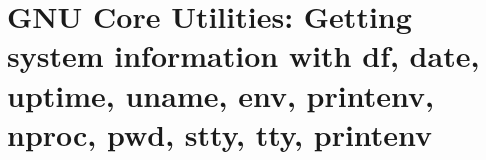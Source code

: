 
\chapter{GNU Core Utilities: Getting system information with df, date, uptime, uname, env, printenv, nproc, pwd, stty, tty, printenv}

